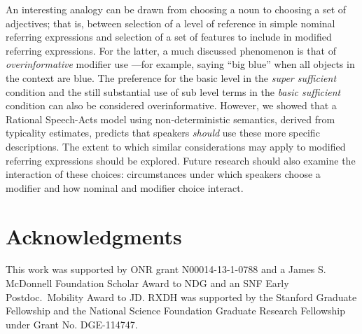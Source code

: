 \documentclass[10pt,letterpaper]{article}
\newcommand{\ndg}[1]{\textcolor{Green}{[ndg: #1]}}
\begin{document}
An interesting analogy can be drawn from choosing a noun to choosing a set of adjectives; that is, between selection of a level of reference in simple nominal referring expressions and selection of a set of features to include in modified referring expressions. 
For the latter, a much discussed phenomenon is that of \emph{overinformative} modifier use \cite{Gatt2014}---for example, saying ``big blue'' when all objects in the context are blue. 
The preference for the basic level in the \emph{super sufficient} condition and the still substantial use of sub level terms in the \emph{basic sufficient} condition can also be considered overinformative. However, we showed that a Rational Speech-Acts model using non-deterministic semantics, derived from typicality estimates, predicts that speakers \emph{should} use these more specific descriptions. 
The extent to which similar considerations may apply to modified referring expressions should be explored.
Future research should also examine the interaction of these choices: circumstances under which speakers choose a modifier and how nominal and modifier choice interact.




\section{\bf Acknowledgments}
\small
This work was supported by ONR grant N00014-13-1-0788 and a James S. McDonnell Foundation Scholar Award to NDG and an SNF Early Postdoc.~Mobility Award to JD. RXDH was supported by the Stanford Graduate Fellowship and the National Science Foundation Graduate Research Fellowship under Grant No. DGE-114747.





\setlength{\bibleftmargin}{.125in}
\setlength{\bibindent}{-\bibleftmargin}


\end{document}
